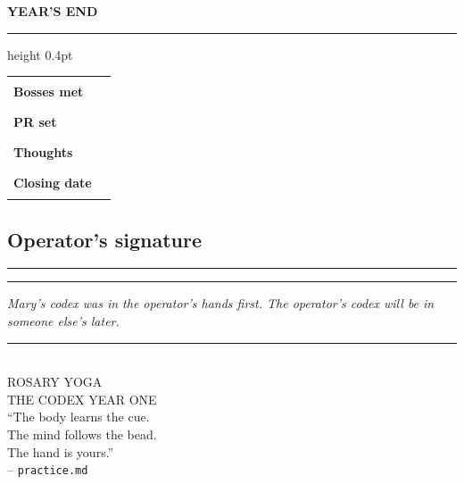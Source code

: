\documentclass[10pt]{article}
\newcommand{\writeline}[1][\linewidth]{\rule[-2pt]{#1}{0.4pt}}
\begin{document}
{\sffamily\bfseries\small YEAR'S END}\par
\vspace{4pt}\hrule height 0.4pt\vspace{6pt}
\footnotesize
\begin{tabularx}{\linewidth}{@{}l X@{}}
\toprule
\textbf{Bosses met}    & \rule[-2pt]{2.2in}{0.4pt} \\
\textbf{PR set}        & \rule[-2pt]{2.2in}{0.4pt} \\
\textbf{Thoughts}      & \rule[-2pt]{2.2in}{0.4pt} \\
\textbf{Closing date}  & \rule[-2pt]{2.2in}{0.4pt} \\
\bottomrule
\end{tabularx}

\vspace{14pt}
\subsection*{Operator's signature}
\writeline\par\vspace{12pt}\writeline\par
\vfill
\textit{\footnotesize Mary's codex was in the operator's hands first.
The operator's codex will be in someone else's later.}
\newpage

\thispagestyle{empty}
\vspace*{\fill}
\begin{center}
  \rule{2in}{0.5pt}\\[8pt]
  {\sffamily\small ROSARY YOGA}\\[2pt]
  {\sffamily\footnotesize THE CODEX \quad YEAR ONE}\\[1in]
  {\sffamily\scriptsize \enquote{The body learns the cue.\\
  The mind follows the bead.\\
  The hand is yours.}}\\[6pt]
  {\sffamily\scriptsize -- \texttt{practice.md}}
\end{center}
\vspace*{\fill}
\end{document}
